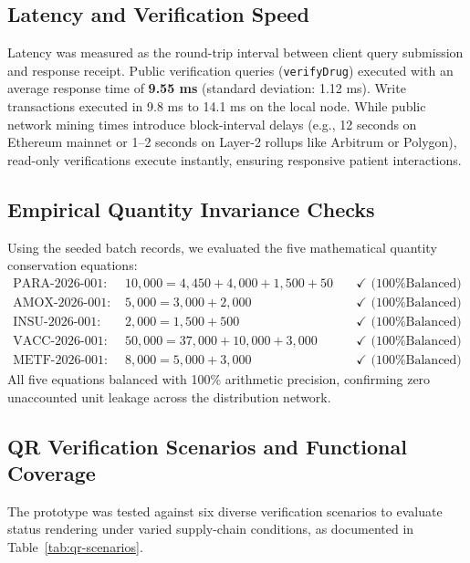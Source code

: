 \documentclass[pdflatex,sn-mathphys-num]{sn-jnl}
\theoremstyle{thmstyleone}
\theoremstyle{thmstyletwo}
\theoremstyle{thmstylethree}
\begin{document}
\subsection{Latency and Verification Speed}

Latency was measured as the round-trip interval between client query submission and response receipt. Public verification queries (\texttt{verifyDrug}) executed with an average response time of \textbf{9.55 ms} (standard deviation: 1.12 ms). Write transactions executed in 9.8 ms to 14.1 ms on the local node. While public network mining times introduce block-interval delays (e.g., 12 seconds on Ethereum mainnet or 1--2 seconds on Layer-2 rollups like Arbitrum or Polygon), read-only verifications execute instantly, ensuring responsive patient interactions.

\subsection{Empirical Quantity Invariance Checks}

Using the seeded batch records, we evaluated the five mathematical quantity conservation equations:
\begin{align}
\text{PARA-2026-001: } & 10,000 = 4,450 + 4,000 + 1,500 + 50 \quad &\checkmark \text{ (100\% Balanced)} \\
\text{AMOX-2026-001: } & 5,000 = 3,000 + 2,000 \quad &\checkmark \text{ (100\% Balanced)} \\
\text{INSU-2026-001: } & 2,000 = 1,500 + 500 \quad &\checkmark \text{ (100\% Balanced)} \\
\text{VACC-2026-001: } & 50,000 = 37,000 + 10,000 + 3,000 \quad &\checkmark \text{ (100\% Balanced)} \\
\text{METF-2026-001: } & 8,000 = 5,000 + 3,000 \quad &\checkmark \text{ (100\% Balanced)}
\end{align}
All five equations balanced with 100\% arithmetic precision, confirming zero unaccounted unit leakage across the distribution network.

\subsection{QR Verification Scenarios and Functional Coverage}

The prototype was tested against six diverse verification scenarios to evaluate status rendering under varied supply-chain conditions, as documented in Table~\ref{tab:qr-scenarios}.
\end{document}
